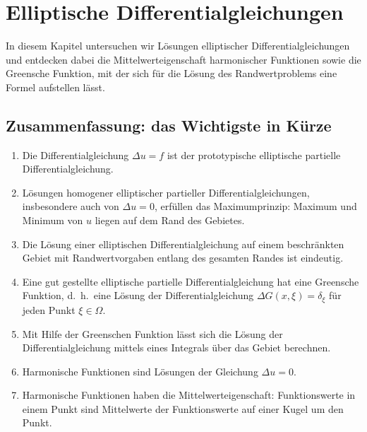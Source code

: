 %
%
%
\chapter{Elliptische Differentialgleichungen\label{chapter-elliptisch}}
In diesem Kapitel untersuchen wir Lösungen elliptischer Differentialgleichungen
und entdecken dabei die Mittelwerteigenschaft
harmonischer Funktionen sowie die Greensche Funktion, mit der sich für
die Lösung des Randwertproblems eine Formel aufstellen lässt.









\section{Zusammenfassung: das Wichtigste in Kürze}
\begin{enumerate}
\item Die Differentialgleichung $\Delta u=f$ ist der prototypische
elliptische partielle Differentialgleichung.
\item Lösungen homogener elliptischer partieller Differentialgleichungen,
insbesondere auch von $\Delta u=0$, erfüllen das Maximumprinzip:
Maximum und Minimum von $u$ liegen auf dem Rand des Gebietes.
\item Die Lösung einer elliptischen Differentialgleichung auf einem
beschränkten Gebiet mit Randwertvorgaben entlang des gesamten Randes
ist eindeutig.
\item Eine gut gestellte elliptische partielle Differentialgleichung hat
eine Greensche Funktion, d.~h.~eine Lösung der Differentialgleichung
$\Delta G(x,\xi)=\delta_\xi$ für jeden Punkt $\xi\in\Omega$.
\item Mit Hilfe der Greenschen Funktion lässt sich die Lösung
der Differentialgleichung mittels eines Integrals über das Gebiet
berechnen.
\item Harmonische Funktionen sind Lösungen der Gleichung $\Delta u=0$.
\item Harmonische Funktionen haben die Mittelwerteigenschaft: Funktionswerte
in einem Punkt sind Mittelwerte der Funktionswerte auf einer Kugel
um den Punkt.
\end{enumerate}


